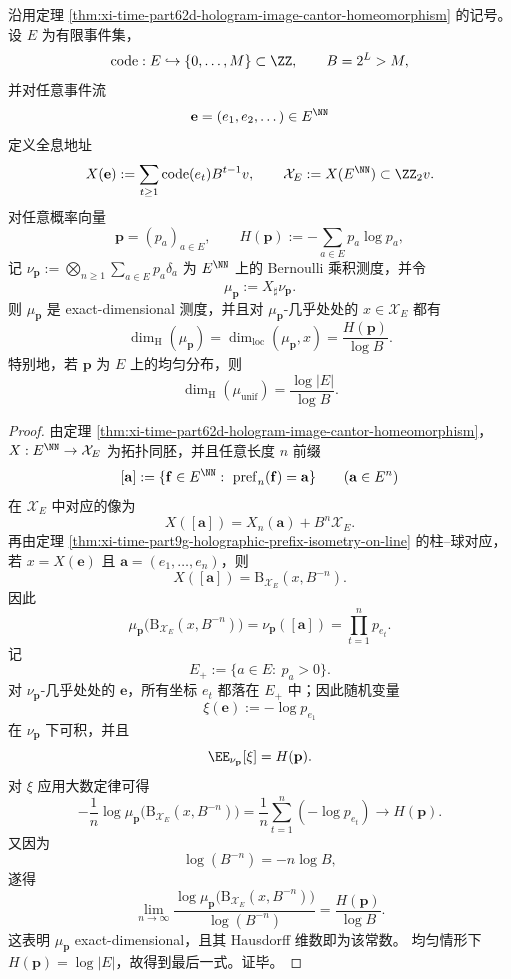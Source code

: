 \begin{theorem}\label{thm:conclusion-holographic-bernoulli-exact-dimensional}
沿用定理 \ref{thm:xi-time-part62d-hologram-image-cantor-homeomorphism} 的记号。设 \(E\) 为有限事件集，
\[
\mathrm{code}:E\hookrightarrow \{0,\dots,M\}\subset \ZZ,
\qquad
B=2^L>M,
\]
并对任意事件流
\[
\mathbf e=(e_1,e_2,\dots)\in E^{\NN}
\]
定义全息地址
\[
X(\mathbf e):=\sum_{t\ge 1}\mathrm{code}(e_t)B^{t-1}v,
\qquad
\mathcal X_E:=X(E^{\NN})\subset \ZZ_2v.
\]
对任意概率向量
\[
\mathbf p=(p_a)_{a\in E},
\qquad
H(\mathbf p):=-\sum_{a\in E}p_a\log p_a,
\]
记 \(\nu_{\mathbf p}:=\bigotimes_{n\ge 1}\sum_{a\in E}p_a\delta_a\) 为 \(E^{\NN}\) 上的 Bernoulli 乘积测度，并令
\[
\mu_{\mathbf p}:=X_\sharp \nu_{\mathbf p}.
\]
则 \(\mu_{\mathbf p}\) 是 exact-dimensional 测度，并且对 \(\mu_{\mathbf p}\)-几乎处处的 \(x\in \mathcal X_E\) 都有
\[
\dim_{\mathrm H}(\mu_{\mathbf p})
=
\dim_{\mathrm{loc}}(\mu_{\mathbf p},x)
=
\frac{H(\mathbf p)}{\log B}.
\]
特别地，若 \(\mathbf p\) 为 \(E\) 上的均匀分布，则
\[
\dim_{\mathrm H}(\mu_{\mathrm{unif}})
=
\frac{\log |E|}{\log B}.
\]
\end{theorem}
\begin{proof}
由定理 \ref{thm:xi-time-part62d-hologram-image-cantor-homeomorphism}，\(X:E^{\NN}\to \mathcal X_E\) 为拓扑同胚，并且任意长度 \(n\) 前缀
\[
[\mathbf a]:=\{\mathbf f\in E^{\NN}:\ \mathrm{pref}_n(\mathbf f)=\mathbf a\}
\qquad (\mathbf a\in E^n)
\]
在 \(\mathcal X_E\) 中对应的像为
\[
X([\mathbf a])=X_n(\mathbf a)+B^n\mathcal X_E.
\]
再由定理 \ref{thm:xi-time-part9g-holographic-prefix-isometry-on-line} 的柱--球对应，若 \(x=X(\mathbf e)\) 且 \(\mathbf a=(e_1,\dots,e_n)\)，则
\[
X([\mathbf a])=\mathrm B_{\mathcal X_E}(x,B^{-n}).
\]
因此
\[
\mu_{\mathbf p}\bigl(\mathrm B_{\mathcal X_E}(x,B^{-n})\bigr)
=
\nu_{\mathbf p}([\mathbf a])
=
\prod_{t=1}^{n}p_{e_t}.
\]
记
\[
E_+:=\{a\in E:\ p_a>0\}.
\]
对 \(\nu_{\mathbf p}\)-几乎处处的 \(\mathbf e\)，所有坐标 \(e_t\) 都落在 \(E_+\) 中；因此随机变量
\[
\xi(\mathbf e):=-\log p_{e_1}
\]
在 \(\nu_{\mathbf p}\) 下可积，并且
\[
\EE_{\nu_{\mathbf p}}[\xi]=H(\mathbf p).
\]
对 \(\xi\) 应用大数定律可得
\[
-\frac1n\log \mu_{\mathbf p}\bigl(\mathrm B_{\mathcal X_E}(x,B^{-n})\bigr)
=
\frac1n\sum_{t=1}^{n}(-\log p_{e_t})
\longrightarrow
H(\mathbf p).
\]
又因为
\[
\log(B^{-n})=-n\log B,
\]
遂得
\[
\lim_{n\to\infty}
\frac{\log \mu_{\mathbf p}\bigl(\mathrm B_{\mathcal X_E}(x,B^{-n})\bigr)}{\log(B^{-n})}
=
\frac{H(\mathbf p)}{\log B}.
\]
这表明 \(\mu_{\mathbf p}\) exact-dimensional，且其 Hausdorff 维数即为该常数。
均匀情形下 \(H(\mathbf p)=\log|E|\)，故得到最后一式。证毕。
\end{proof}

